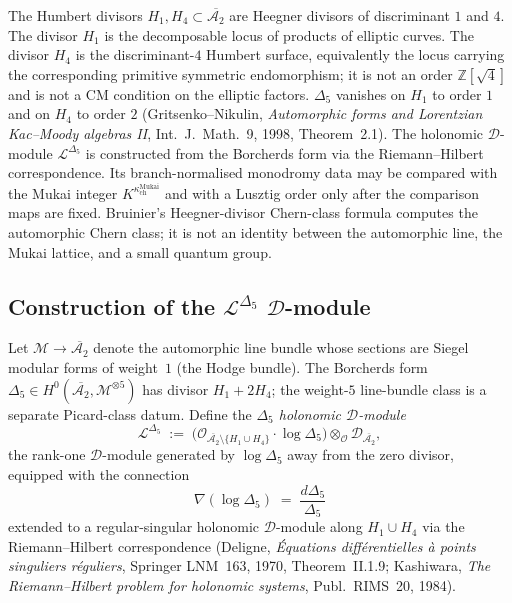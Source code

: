 The Humbert divisors $H_1, H_4 \subset \overline{\mathcal{A}_2}$ are Heegner divisors of discriminant $1$ and $4$. The divisor $H_1$ is the decomposable locus of products of elliptic curves. The divisor $H_4$ is the discriminant-$4$ Humbert surface, equivalently the locus carrying the corresponding primitive symmetric endomorphism; it is not an order $\mathbb{Z}[\sqrt{4}]$ and is not a CM condition on the elliptic factors. $\Delta_5$ vanishes on $H_1$ to order $1$ and on $H_4$ to order $2$ (Gritsenko--Nikulin, \emph{Automorphic forms and Lorentzian Kac--Moody algebras II}, Int.~J.~Math.~9, 1998, Theorem~2.1). The holonomic $\mathcal{D}$-module $\mathcal{L}^{\Delta_5}$ is constructed from the Borcherds form via the Riemann--Hilbert correspondence. Its branch-normalised monodromy data may be compared with the Mukai integer \(K^{\kappa_{\mathrm{ch}}^{\mathrm{Mukai}}}\) and with a Lusztig order only after the comparison maps are fixed. Bruinier's Heegner-divisor Chern-class formula computes the automorphic Chern class; it is not an identity between the automorphic line, the Mukai lattice, and a small quantum group.

\subsection{Construction of the \texorpdfstring{$\mathcal{L}^{\Delta_5}$}{L-Delta-5} \texorpdfstring{$\mathcal{D}$}{D}-module}

\begin{definition}
\label{def:L-delta5-dmodule}
Let $\mathcal{M}\to \overline{\mathcal{A}_2}$ denote the automorphic line bundle whose sections are Siegel modular forms of weight~$1$ (the Hodge bundle). The Borcherds form $\Delta_5\in H^0(\overline{\mathcal{A}_2},\mathcal{M}^{\otimes 5})$ has divisor $H_1+2H_4$; the weight-$5$ line-bundle class is a separate Picard-class datum. Define the \emph{$\Delta_5$ holonomic $\mathcal{D}$-module}
\[
 \mathcal{L}^{\Delta_5}
 \;:=\;
 \bigl(\mathcal{O}_{\overline{\mathcal{A}_2}\setminus\{H_1\cup H_4\}}\cdot \log\Delta_5\bigr)
 \otimes_{\mathcal{O}}
 \mathcal{D}_{\overline{\mathcal{A}_2}},
\]
the rank-one $\mathcal{D}$-module generated by $\log\Delta_5$ away from the zero divisor, equipped with the connection
\[
 \nabla(\log\Delta_5)
 \;=\;
 \frac{d\Delta_5}{\Delta_5}
\]
extended to a regular-singular holonomic $\mathcal{D}$-module along $H_1\cup H_4$ via the Riemann--Hilbert correspondence (Deligne, \emph{\'Equations diff\'erentielles \`a points singuliers r\'eguliers}, Springer LNM~163, 1970, Theorem~II.1.9; Kashiwara, \emph{The Riemann--Hilbert problem for holonomic systems}, Publ.~RIMS~20, 1984).
\end{definition}

